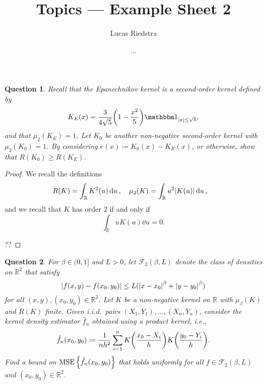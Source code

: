\documentclass{article}
\title{Topics  --- Example Sheet  2} %
\author{Lucas Riedstra}
\date{...} %
\theoremstyle{plain}
\newtheorem{question}{Question}
\theoremstyle{remark}
\newcommand{\Bb}{\mathbb}
\newcommand{\Cal}{\mathcal}
\newcommand{\RR}{\Bb R}
\newcommand\FF{\Cal F}
\newcommand\ceq\coloneqq %
\newcommand\ind{\mathbbm 1} %
\DeclareMathOperator\MSE{MSE}
\begin{document}
\maketitle

\begin{question}
	Recall that the Epanechnikov kernel is a second-order kernel defined by
	\[
	K_E(x) = \frac3{4\sqrt5} \qty(1 - \frac{x^2}{5}) \ind_{\abs{x} \leq\sqrt5},
	\]
	and that $\mu_2(K_E) = 1$. Let $K_0$ be another non-negative second-order kernel with $\mu_2(K_0) = 1$. By considering $e(x) \ceq K_0(x) - K_E(x)$, or otherwise, show that $R(K_0) \geq R(K_E)$. 
\end{question}

\begin{proof}
	We recall the definitions
	\[
	R(K) = \int_\RR K^2(u) \dd{u}, \quad \mu_2(K) = \int_\RR u^2 \abs{K(u)} \dd{u}, \quad 
	\]
	and we recall that $K$ has order 2 if and only if
	\[
	\int_\RR u K(u) \dd{u} = 0. 
	\]
	
	??
\end{proof}

\begin{question}
	For $\beta \in (0, 1]$ and $L > 0$, let $\FF_2(\beta, L)$ denote the class of densities on $\RR^2$ that satisfy
	\[
	\abs{f(x, y) - f(x_0, y_0)} \leq L(\abs{x - x_0}^\beta + \abs{y - y_0}^\beta)
	\]
	for all $(x, y), (x_0, y_0) \in \RR^2$. Let $K$ be a non-negative kernel on $\RR$ with $\mu_\beta(K)$ and $R(K)$ finite. Given i.i.d.\ pairs $(X_1, Y_1), \dotsc, (X_n, Y_n)$, consider the kernel density estimator $\hat f_n$ obtained using a product kernel, i.e., 
	\[
	\hat f_n(x_0, y_0) \ceq \frac1{nh^2} \sum_{i=1}^n K\qty(\frac{x_0 - X_i}{h}) K\qty(\frac{y_0 - Y_i}{h}). 
	\]
	Find a bound on $\MSE\qty{\hat f_n(x_0, y_0)}$ that holds uniformly for all $f \in \FF_2(\beta, L)$ and $(x_0, y_0) \in \RR^2$. 
\end{question}
\end{document}
